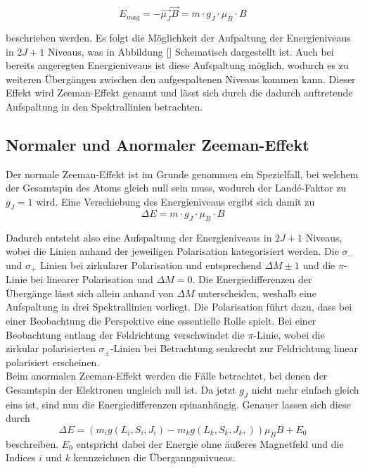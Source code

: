 \begin{equation}
    E_{mag} =  -\vec{\mu_J} \vec{B} = m\cdot g_J\cdot \mu_B\cdot B
\end{equation}

beschrieben werden. Es folgt die Möglichkeit der Aufpaltung der Energieniveaus in $2J+1$ Niveaus, was in Abbildung [] Schematisch dargestellt ist.
Auch bei bereits angeregten Energieniveaus ist diese Aufspaltung möglich, wodurch es zu weiteren Übergängen zwischen den aufgespaltenen Niveaus 
kommen kann. Dieser Effekt wird Zeeman-Effekt genannt und lässt sich durch die dadurch auftretende Aufspaltung in den Spektrallinien betrachten.

\subsection{Normaler und Anormaler Zeeman-Effekt}

Der normale Zeeman-Effekt ist im Grunde genommen ein Spezielfall, bei welchem der Gesamtspin des Atoms gleich null sein muss, wodurch der 
Landé-Faktor zu $g_J = 1$ wird. Eine Verschiebung des Energieniveaus ergibt sich damit zu 
\begin{equation}
    \Delta E = m\cdot g_J\cdot \mu_B\cdot B
\end{equation}

Dadurch entsteht also eine Aufspaltung der Energieniveaus in $2J+1$ Niveaus, wobei die Linien anhand der jeweiligen Polarisation kategorisiert
werden. Die $\sigma_-$ und $\sigma_+$ Linien bei zirkularer Polarisation und entsprechend $\Delta M \pm 1$ und die $\pi$-Linie bei linearer 
Polarisation und $\Delta M =0$. Die Energiedifferenzen der Übergänge lässt sich allein anhand von $\Delta M$ unterscheiden, weshalb eine 
Aufspaltung in drei Spektrallinien vorliegt. Die Polarisation führt dazu, dass bei einer Beobachtung die Perspektive eine essentielle Rolle spielt.
Bei einer Beobachtung entlang der Feldrichtung verschwindet die $\pi$-Linie, wobei die zirkular polarisierten $\sigma_{\pm}$-Linien bei 
Betrachtung senkrecht zur Feldrichtung linear polarisiert erscheinen. 
\\
Beim anormalen Zeeman-Effekt werden die Fälle betrachtet, bei denen der Gesamtspin der Elektronen ungleich null ist. Da jetzt $g_J$ nicht mehr 
einfach gleich eins ist, sind nun die Energiedifferenzen spinanhängig. Genauer lassen sich diese durch 
\begin{equation}
    \Delta E = (m_i g(L_i,S_i,J_i) -m_k g(L_k,S_k,J_k,))\mu_B B + E_0
\end{equation}
beschreiben. $E_0$ entspricht dabei der Energie ohne äußeres Magnetfeld und die Indices $i$ und $k$ kennzeichnen die Überganngsnivueas. 

